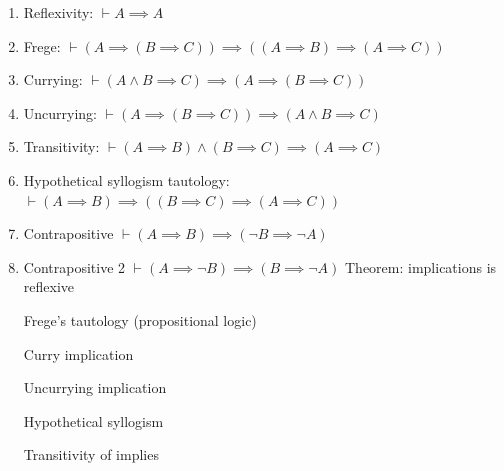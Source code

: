 \begin{node}
\begin{enumerate}
\LA{}Right distributivity of conjunction over disjunction~{\nwtagstyle{}}\RA{}
\nwendcode{}\nwdocspar
\item {} Reflexivity: $\vdash A\implies A$
\item {} Frege: $\vdash(A\implies(B\implies C))\implies((A\implies B)\implies(A\implies C))$
\item {} Currying: $\vdash(A\land B\implies C)\implies(A\implies(B\implies C))$
\item {} Uncurrying: $\vdash(A\implies(B\implies C))\implies(A\land B\implies C)$
\item {} Transitivity: $\vdash(A\implies B)\land(B\implies C)\implies(A\implies C)$
\item {} Hypothetical syllogism tautology: $\vdash(A\implies B)\implies((B\implies C)\implies(A\implies C))$
\item {} Contrapositive $\vdash(A\implies B)\implies(\neg B\implies\neg A)$
\item {} Contrapositive 2 $\vdash(A\implies\neg B)\implies(B\implies\neg A)$
\nwenddocs{}\plusendmoddef\nwstartdeflinemarkup{}\nwenddeflinemarkup
\LA{}Theorem: implications is reflexive~{\nwtagstyle{}}\RA{}

\LA{}Frege's tautology (propositional logic)~{\nwtagstyle{}}\RA{}

\LA{}Curry implication~{\nwtagstyle{}}\RA{}

\LA{}Uncurrying implication~{\nwtagstyle{}}\RA{}

\LA{}Hypothetical syllogism~{\nwtagstyle{}}\RA{}

\LA{}Transitivity of implies~{\nwtagstyle{}}\RA{}


\end{enumerate}
\end{node}
